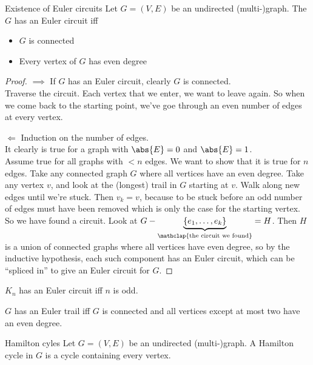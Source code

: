 \documentclass[english]{lbscript}
\begin{document}
\begin{theorem}{Existence of Euler circuits}{}
	Let \(G=(V,E)\) be an undirected (multi-)graph. \tcblower
	The \(G\) has an Euler circuit iff
	\begin{itemize}
		\item \(G\) is connected
		\item Every vertex of \(G\) has even degree
	\end{itemize}
\end{theorem}
\begin{proof}
	\(⟹\) If \(G\) has an Euler circuit, clearly \(G\) is connected.\\
	Traverse the circuit. Each vertex that we enter, we want to leave again. So when we come back to the starting point, we've goe through an even number of edges at every vertex.

	\(\Longleftarrow\) Induction on the number of edges.\\
	It clearly is true for a graph with \(\abs{E}=0\) and \(\abs{E}=1\).\\
	Assume true for all graphs with \(<n\) edges. We want to show that it is true for \(n\) edges. Take any connected graph \(G\) where all vertices have an even degree. Take any vertex \(v\), and look at the (longest) trail in \(G\) starting at \(v\). Walk along new edges until we're stuck. Then \(v_k=v\), because to be stuck before an odd number of edges must have been removed which is only the case for the starting vertex. So we have found a circuit. Look at \(G-\underbrace{\left\{ e_1, \dots, e_k \right\}}_{\mathclap{\text{the circuit we found}}} = H\). Then \(H\) is a union of connected graphs where all vertices have even degree, so by the inductive hypothesis, each such component has an Euler circuit, which can be \enquote{spliced in} to give an Euler circuit for \(G\).
\end{proof}

\begin{corollary}{}{}
	\(K_n\) has an Euler circuit iff \(n\) is odd.
\end{corollary}

\begin{corollary}{}{}
	\(G\) has an Euler trail iff \(G\) is connected and all vertices except at most two have an even degree.
\end{corollary}

\begin{definition}{Hamilton cyles}{}
	Let \(G=(V,E)\) be an undirected (multi-)graph. A Hamilton cycle in \(G\) is a cycle containing every vertex.
\end{definition}
\end{document}
